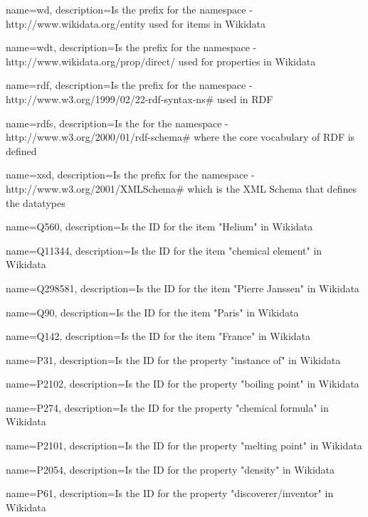 {
    name=wd,
    description={Is the prefix for the namespace - http://www.wikidata.org/entity used for items in Wikidata}
}

{
    name=wdt,
    description={Is the prefix for the namespace - http://www.wikidata.org/prop/direct/ used for properties in Wikidata}
}


{
    name=rdf,
    description={Is the prefix for the namespace - http://www.w3.org/1999/02/22-rdf-syntax-ns\# used in RDF}
}

{
    name=rdfs,
    description={Is the for the namespace - http://www.w3.org/2000/01/rdf-schema\# where the core vocabulary of RDF is defined}
}


{
    name=xsd,
    description={Is the prefix for the namespace - http://www.w3.org/2001/XMLSchema\# which is the XML Schema that defines the datatypes}
}

{
    name=Q560,
    description={Is the ID for the item "Helium" in Wikidata}
}

{
    name=Q11344,
    description={Is the ID for the item "chemical element" in Wikidata}
}

{
    name=Q298581,
    description={Is the ID for the item "Pierre Janssen" in Wikidata}
}

{
    name=Q90,
    description={Is the ID for the item "Paris" in Wikidata}
}

{
    name=Q142,
    description={Is the ID for the item "France" in Wikidata}
}

{
    name=P31,
    description={Is the ID for the property "instance of" in Wikidata}
}

{
    name=P2102,
    description={Is the ID for the property "boiling point" in Wikidata}
}

{
    name=P274,
    description={Is the ID for the property "chemical formula" in Wikidata}
}

{
    name=P2101,
    description={Is the ID for the property "melting point" in Wikidata}
}

{
    name=P2054,
    description={Is the ID for the property "density" in Wikidata}
}

{
    name=P61,
    description={Is the ID for the property "discoverer/inventor" in Wikidata}
}

